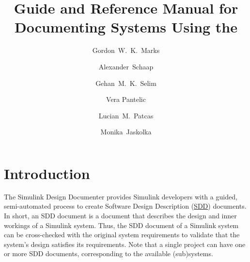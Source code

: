 \documentclass{mcscert}
\title{Guide and Reference Manual for Documenting \simulink{} Systems Using the \sddtool{}}
\author{Gordon~W.~K.~Marks \and Alexander~Schaap  \and Gehan~M.~K.~Selim \and Vera Pantelic \and Lucian~M.~Patcas \and Monika~Jaskolka}
\institute{McMaster Centre for Software Certification (McSCert), McMaster University, Hamilton, Ontario, Canada}
\newcommand{\simulink}{Simulink}
\newcommand{\sddtool}{Simulink Design Documenter}
\begin{document}
  \maketitle
  \tableofcontents


\chapter{Introduction}
\label{ch:introduction}
The \sddtool{} provides \simulink{} developers with a guided, 
semi-automated process to create Software Design Description 
(\hyperref[acr:sdd]{SDD}) documents. 
In short, an SDD document is a document that describes the design and inner 
workings of a \simulink{} system. 
Thus, the SDD document of a \simulink{} system can be cross-checked with the 
original system requirements to validate that the system's design satisfies its 
requirements. 
Note that a single project can have one or more SDD documents, 
corresponding to the available (sub)systems. 
  
\end{document}

